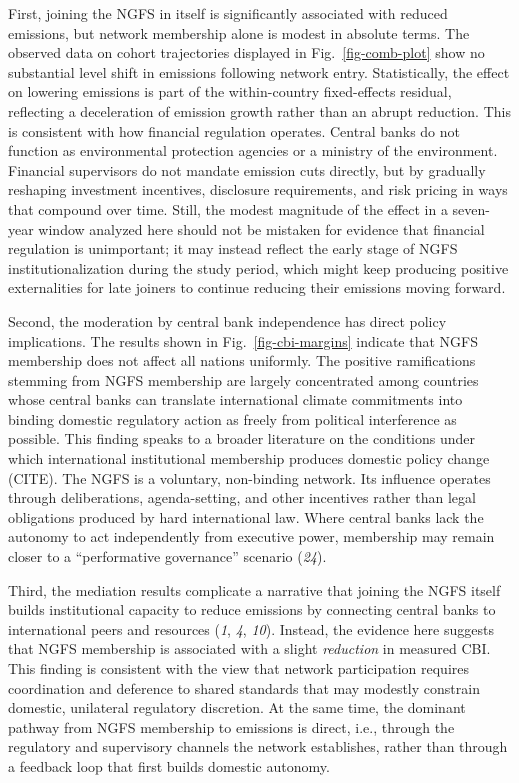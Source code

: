 \documentclass[
  12pt,
  letterpaper,
]{article}
\begin{document}
First, joining the NGFS in itself is significantly associated with
reduced emissions, but network membership alone is modest in absolute
terms. The observed data on cohort trajectories displayed in
Fig.~\ref{fig-comb-plot} show no substantial level shift in emissions
following network entry. Statistically, the effect on lowering emissions
is part of the within-country fixed-effects residual, reflecting a
deceleration of emission growth rather than an abrupt reduction. This is
consistent with how financial regulation operates. Central banks do not
function as environmental protection agencies or a ministry of the
environment. Financial supervisors do not mandate emission cuts
directly, but by gradually reshaping investment incentives, disclosure
requirements, and risk pricing in ways that compound over time. Still,
the modest magnitude of the effect in a seven-year window analyzed here
should not be mistaken for evidence that financial regulation is
unimportant; it may instead reflect the early stage of NGFS
institutionalization during the study period, which might keep producing
positive externalities for late joiners to continue reducing their
emissions moving forward.

Second, the moderation by central bank independence has direct policy
implications. The results shown in Fig.~\ref{fig-cbi-margins} indicate
that NGFS membership does not affect all nations uniformly. The positive
ramifications stemming from NGFS membership are largely concentrated
among countries whose central banks can translate international climate
commitments into binding domestic regulatory action as freely from
political interference as possible. This finding speaks to a broader
literature on the conditions under which international institutional
membership produces domestic policy change (CITE). The NGFS is a
voluntary, non-binding network. Its influence operates through
deliberations, agenda-setting, and other incentives rather than legal
obligations produced by hard international law. Where central banks lack
the autonomy to act independently from executive power, membership may
remain closer to a ``performative governance'' scenario (\emph{24}).

Third, the mediation results complicate a narrative that joining the
NGFS itself builds institutional capacity to reduce emissions by
connecting central banks to international peers and resources (\emph{1},
\emph{4}, \emph{10}). Instead, the evidence here suggests that NGFS
membership is associated with a slight \emph{reduction} in measured CBI.
This finding is consistent with the view that network participation
requires coordination and deference to shared standards that may
modestly constrain domestic, unilateral regulatory discretion. At the
same time, the dominant pathway from NGFS membership to emissions is
direct, i.e., through the regulatory and supervisory channels the
network establishes, rather than through a feedback loop that first
builds domestic autonomy.
\end{document}
